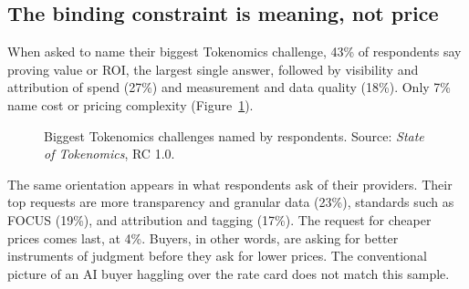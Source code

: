 \documentclass[11pt,a4paper]{article}
\begin{document}
\subsection{The binding constraint is meaning, not price}

When asked to name their biggest Tokenomics challenge, 43\% of respondents say proving value or ROI, the largest single answer, followed by visibility and attribution of spend (27\%) and measurement and data quality (18\%). Only 7\% name cost or pricing complexity (Figure~\ref{fig:challenges}).

\begin{figure}[h]
\centering
{}
\caption{Biggest Tokenomics challenges named by respondents. Source: \emph{State of Tokenomics}, RC 1.0.}
\label{fig:challenges}
\end{figure}

The same orientation appears in what respondents ask of their providers. Their top requests are more transparency and granular data (23\%), standards such as FOCUS (19\%), and attribution and tagging (17\%). The request for cheaper prices comes last, at 4\%. Buyers, in other words, are asking for better instruments of judgment before they ask for lower prices. The conventional picture of an AI buyer haggling over the rate card does not match this sample.
\end{document}
